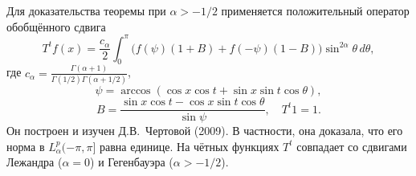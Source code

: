 Для доказательства теоремы при $\alpha>-1/2$ применяется положительный оператор
обобщённого сдвига
\[
T^{t}f(x)=\frac{c_{\alpha}}{2}\int_{0}^{\pi}\bigl(f(\psi)(1+B)+
f(-\psi)(1-B)\bigr)\sin^{2\alpha}\theta\,d\theta,
\]
где $c_{\alpha}=\frac{\Gamma(\alpha+1)}{\Gamma(1/2)\Gamma(\alpha+1/2)}$,
\[
\psi=\arccos (\cos x\cos t+\sin x\sin t\cos \theta),
\]
\[
B=\frac{\sin x\cos t-\cos x\sin t\cos \theta}{\sin \psi},\quad T^{t}1=1.
\]
Он построен и изучен Д.В.~Чертовой (2009). В частности, она доказала, что его
норма в $L_{\alpha}^{p}(-\pi,\pi]$ равна единице. На чётных функциях $T^{t}$
совпадает со сдвигами Лежандра ($\alpha=0$) и Гегенбауэра ($\alpha>-1/2$).
